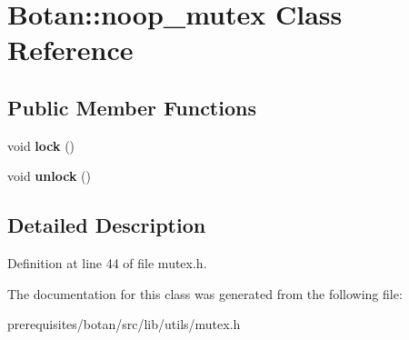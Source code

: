 \hypertarget{class_botan_1_1noop__mutex}{}\section{Botan\+:\+:noop\+\_\+mutex Class Reference}
\label{class_botan_1_1noop__mutex}
\subsection*{Public Member Functions}
\begin{DoxyCompactItemize}
\item 
\mbox{\label{class_botan_1_1noop__mutex_a1048fc69b67dbbc2f1fca74782c5e856}} 
void {\bfseries lock} ()
\item 
\mbox{\label{class_botan_1_1noop__mutex_af408cdb9c78ba2fda17fee0781b3ab53}} 
void {\bfseries unlock} ()
\end{DoxyCompactItemize}


\subsection{Detailed Description}


Definition at line 44 of file mutex.\+h.



The documentation for this class was generated from the following file\+:\begin{DoxyCompactItemize}
\item 
prerequisites/botan/src/lib/utils/mutex.\+h\end{DoxyCompactItemize}

